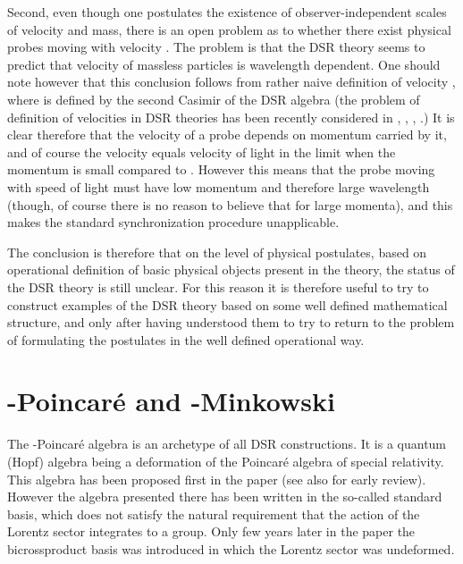 \documentclass[a4paper,a4paper]{article}
\begin{document}
Second, even though one postulates the existence of observer-independent scales of velocity and mass,  there is an open problem as to whether there exist physical probes moving with velocity \coordHE{}. The problem is that the DSR theory seems to predict that velocity of massless particles is wavelength dependent. One should note however that this conclusion follows from rather naive definition of velocity \coordHE{}, where \coordHE{} is defined by the second Casimir of the DSR algebra (the problem of definition of velocities in DSR theories has been recently considered in \cite{luknowv}, \cite{rs}, \cite{granik}, \cite{THMT}.) It is clear therefore that the velocity of a probe depends on  momentum carried by it, and of course the velocity equals velocity of light \coordHE{} in the limit when the momentum is small compared to \coordHE{}. However this means that the probe moving with speed of light must have low momentum and therefore large wavelength (though, of course there is no reason to believe that \coordHE{} for large momenta), and this makes the standard synchronization procedure unapplicable.

The conclusion is therefore that on the level of physical postulates, based on operational definition of basic physical objects present in the theory, the status of the DSR theory is still unclear. For this reason it is therefore useful to try to construct examples of the DSR theory based on some well defined mathematical structure, and only after having understood them to try to return to the problem of formulating the postulates in the well defined operational way.


\section{\myHighlight{$\kappa$}\coordHE{}-Poincar\'e and \myHighlight{$\kappa$}\coordHE{}-Minkowski} 

The \myHighlight{$\kappa$}\coordHE{}-Poincar\'e  algebra is an archetype of all DSR constructions. It is a quantum (Hopf) algebra being a deformation of the Poincar\'e algebra of special relativity. This algebra has been proposed first in the paper \cite{lunoruto} (see also \cite{rurev} for early review). However the algebra presented there has been written in the so-called standard basis, which does not satisfy the natural requirement that the action of the Lorentz sector integrates to a group. Only few years later in the paper \cite{maru} the bicrossproduct basis was introduced in which the Lorentz sector was undeformed. 
\end{document}

